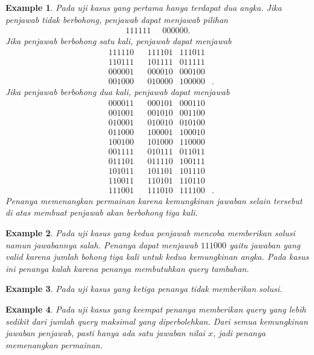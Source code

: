 \documentclass[conference,compsoc]{IEEEtran}
\newtheorem{exmp}{Example}[section]
\begin{document}
\begin{exmp}
Pada uji kasus yang pertama hanya terdapat dua angka. Jika penjawab tidak berbohong, penjawab dapat menjawab pilihan
\begin{align*}
111111 \;\;& 000000\textrm{.}
\end{align*}
Jika penjawab berbohong satu kali, penjawab dapat menjawab
\begin{align*}
& 111110 & & 111101 & 111011 \\
& 110111 & & 101111 & 011111 \\
& 000001 & & 000010 & 000100 \\
& 001000 & & 010000 & 100000 &\textrm{.}
\end{align*}
Jika penjawab berbohong dua kali, penjawab dapat menjawab
\begin{align*}
& 000011 & & 000101 & 000110 \\
& 001001 & & 001010 & 001100 \\
& 010001 & & 010010 & 010100 \\
& 011000 & & 100001 & 100010 \\
& 100100 & & 101000 & 110000 \\
& 001111 & & 010111 & 011011 \\
& 011101 & & 011110 & 100111 \\
& 101011 & & 101101 & 101110 \\
& 110011 & & 110101 & 110110 \\
& 111001 & & 111010 & 111100 &\textrm{.}
\end{align*}
Penanya memenangkan permainan karena kemungkinan jawaban selain tersebut di atas membuat penjawab akan berbohong tiga kali.
\end{exmp}

\begin{exmp}
Pada uji kasus yang kedua penjawab mencoba memberikan solusi namun jawabannya salah. Penanya dapat menjawab $111000$ yaitu jawaban yang valid karena jumlah bohong tiga kali untuk kedua kemungkinan angka. Pada kasus ini penanya kalah karena penanya membutuhkan query tambahan.
\end{exmp}

\begin{exmp}
Pada uji kasus yang ketiga penanya tidak memberikan solusi.
\end{exmp}

\begin{exmp}
Pada uji kasus yang keempat penanya memberikan query yang lebih sedikit dari jumlah query maksimal yang diperbolehkan. Dari semua kemungkinan jawaban penjawab, pasti hanya ada satu jawaban nilai $x$, jadi penanya memenangkan permainan.
\end{exmp}
\end{document}
